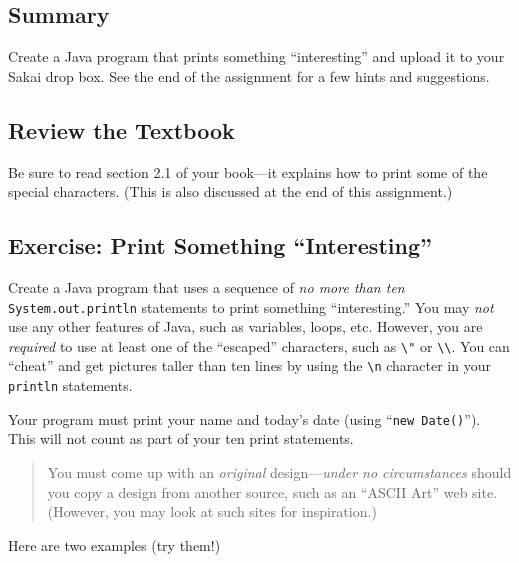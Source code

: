 


\subsection*{Summary}
Create a Java program that prints something ``interesting'' and upload
it to your Sakai drop box. See the end
of the assignment for a few hints and suggestions.

\subsection*{Review the Textbook}
Be sure to read section 2.1 of your book---it explains how to print some of the
special characters. (This is also discussed at the end of this assignment.)

\subsection*{Exercise: Print Something ``Interesting''}
Create a Java program that uses a sequence of {\em no
more than ten} {\tt System.out.println} statements to print something
``interesting.'' You may {\em not} use any other features of Java, such as
variables, loops, etc.  However, you are {\em required} to use at least
one of the ``escaped'' characters, such as \verb$\"$ or \verb$\\$. You
can ``cheat'' and get pictures taller than ten lines by using the \verb$\n$
character in your {\tt println} statements.

Your program must print your name and today's date (using ``{\tt new Date()}''). 
This will not count as part of your ten print statements.

\begin{quote}
You must come up with an {\em original} design---{\em under no circumstances} 
should you 
copy a design from another source, such as an ``ASCII Art'' web site. (However,
you may look at such sites for inspiration.)
\end{quote}

Here are two examples (try them!)
\newpage

